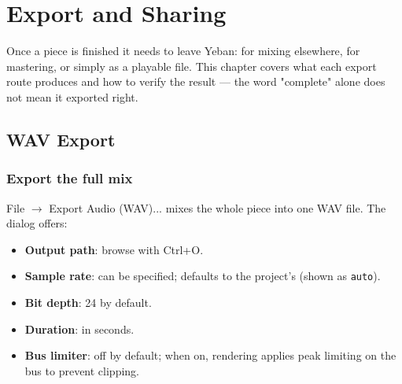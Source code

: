
\chapter{Export and Sharing}
\label{ch:export-sharing}






Once a piece is finished it needs to leave Yeban: for mixing elsewhere, for mastering,
or simply as a playable file. This chapter covers what each export route produces and
how to verify the result — the word "complete" alone does not mean it exported right.

\section{WAV Export}

\subsection{Export the full mix}

File $\to$ Export Audio (WAV)... mixes the whole piece into one WAV file. The dialog
offers:

\begin{itemize}
  \item \textbf{Output path}: browse with Ctrl+O.
  \item \textbf{Sample rate}: can be specified; defaults to the project's (shown as \texttt{auto}).
  \item \textbf{Bit depth}: 24 by default.
  \item \textbf{Duration}: in seconds.
  \item \textbf{Bus limiter}: off by default; when on, rendering applies peak limiting on the bus to prevent clipping.
\end{itemize}


